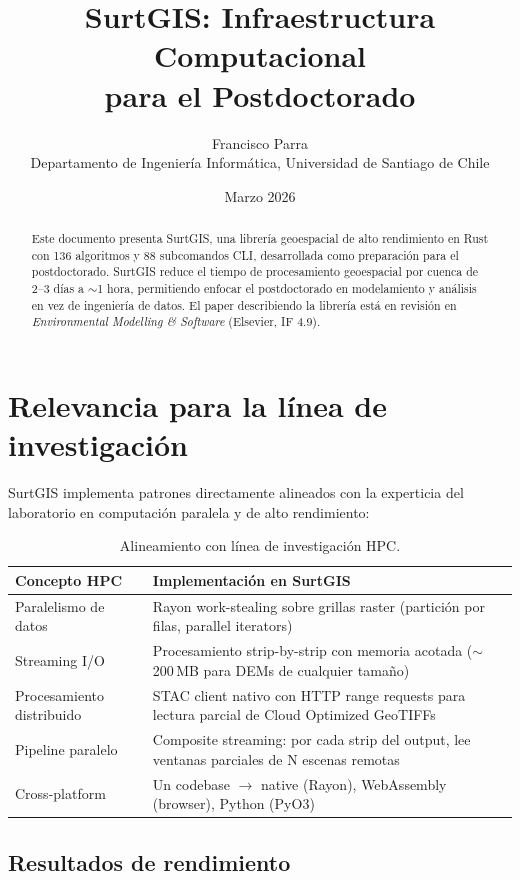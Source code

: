 \documentclass[11pt,a4paper]{article}
\title{\textbf{SurtGIS: Infraestructura Computacional\\para el Postdoctorado}}
\author{Francisco Parra\\
\small Departamento de Ingenier\'ia Inform\'atica, Universidad de Santiago de Chile}
\date{Marzo 2026}
\begin{document}
\maketitle

\begin{abstract}
\noindent Este documento presenta SurtGIS, una librer\'ia geoespacial de alto rendimiento en Rust con 136 algoritmos y 88 subcomandos CLI, desarrollada como preparaci\'on para el postdoctorado. SurtGIS reduce el tiempo de procesamiento geoespacial por cuenca de 2--3 d\'ias a $\sim$1 hora, permitiendo enfocar el postdoctorado en modelamiento y an\'alisis en vez de ingenier\'ia de datos. El paper describiendo la librer\'ia est\'a en revisi\'on en \textit{Environmental Modelling \& Software} (Elsevier, IF 4.9).
\end{abstract}

\section{Relevancia para la l\'inea de investigaci\'on}

SurtGIS implementa patrones directamente alineados con la experticia del laboratorio en computaci\'on paralela y de alto rendimiento:

\begin{table}[h]
\centering
\small
\begin{tabularx}{\textwidth}{lX}
\toprule
\textbf{Concepto HPC} & \textbf{Implementaci\'on en SurtGIS} \\
\midrule
Paralelismo de datos & Rayon work-stealing sobre grillas raster (partici\'on por filas, parallel iterators) \\
Streaming I/O & Procesamiento strip-by-strip con memoria acotada ($\sim$200\,MB para DEMs de cualquier tama\~no) \\
Procesamiento distribuido & STAC client nativo con HTTP range requests para lectura parcial de Cloud Optimized GeoTIFFs \\
Pipeline paralelo & Composite streaming: por cada strip del output, lee ventanas parciales de N escenas remotas \\
Cross-platform & Un codebase $\to$ native (Rayon), WebAssembly (browser), Python (PyO3) \\
\bottomrule
\end{tabularx}
\caption{Alineamiento con l\'inea de investigaci\'on HPC.}
\end{table}

\subsection{Resultados de rendimiento}
\end{document}
